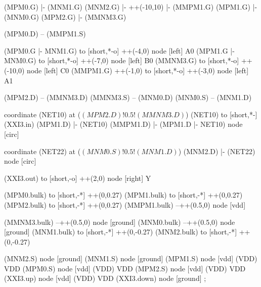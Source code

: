 \begin{circuitikz}[american]

	(MPM0.G) |- (MNM1.G)
	(MNM2.G) |- ++(-10,10) |- (MMPM1.G)
	(MPM1.G) |- (MNM0.G)
	(MPM2.G) |- (MMNM3.G)
	
	(MPM0.D) -- (MMPM1.S)
	
	(MPM0.G |- MNM1.G) to [short,*-o] ++(-4,0) node [left] {A0}
	(MPM1.G |- MNM0.G) to [short,*-o] ++(-7,0) node [left] {B0}
	(MMNM3.G) to [short,*-o] ++(-10,0) node [left] {C0}
	(MMPM1.G) ++(-1,0) to [short,*-o] ++(-3,0) node [left] {A1}
	
	(MPM2.D) -- (MMNM3.D)
	(MMNM3.S) -- (MNM0.D)
	(MNM0.S) -- (MNM1.D)

	coordinate (NET10) at ($(MPM2.D)!0.5!(MMNM3.D)$)
	(NET10) to [short,*-] (XXI3.in)
	(MPM1.D) |- (NET10)
	(MMPM1.D) |- (MPM1.D |- NET10) node [circ] {}
	
	coordinate (NET22) at ($(MNM0.S)!0.5!(MNM1.D)$)
	(MNM2.D) |- (NET22) node [circ] {}
	
	(XXI3.out) to [short,-o] ++(2,0) node [right] {Y}

	(MPM0.bulk) to [short,-*] ++(0,0.27)
	(MPM1.bulk) to [short,-*] ++(0,0.27)	
	(MPM2.bulk) to [short,-*] ++(0,0.27)	
	(MMPM1.bulk) --++(0.5,0) node [vdd]{}
	
	(MMNM3.bulk) --++(0.5,0) node [ground]{}
	(MNM0.bulk) --++(0.5,0) node [ground]{}
	(MNM1.bulk) to [short,-*] ++(0,-0.27)
	(MNM2.bulk) to [short,-*] ++(0,-0.27)



	(MNM2.S) node [ground] {}
	(MNM1.S) node [ground] {}
	(MPM1.S) node [vdd] (VDD) {VDD}
	(MPM0.S) node [vdd] (VDD) {VDD}
	(MPM2.S) node [vdd] (VDD) {VDD}
	(XXI3.up) node [vdd] (VDD) {VDD}
	(XXI3.down) node [ground] {}
;

\end{circuitikz}
